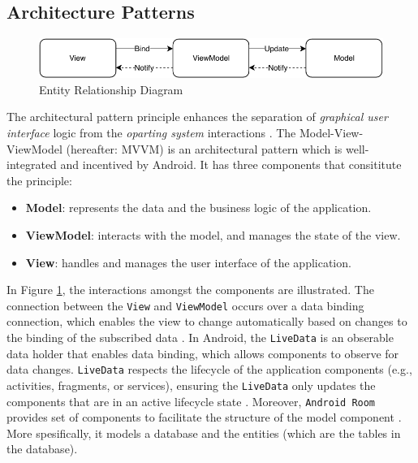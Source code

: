 \subsection{Architecture Patterns}

\begin{figure}
    \centering
    \includegraphics[scale=0.7]{images/MVVM.pdf}
    \caption{Entity Relationship Diagram}
    \label{fig:mvvm}
\end{figure}

The architectural pattern principle enhances the separation of \textit{graphical user interface} logic from the \textit{oparting system} interactions \cite{architecture}. The Model-View-ViewModel (hereafter: MVVM) is an architectural pattern which is well-integrated and incentived by Android. It has three components that consititute the principle:
\begin{itemize}
    \item \textbf{Model}: represents the data and the business logic of the application. 
    \item \textbf{ViewModel}: interacts with the model, and manages the state of the view.
    \item \textbf{View}: handles and manages the user interface of the application.
\end{itemize}

In Figure \ref{fig:mvvm}, the interactions amongst the components are illustrated. The connection between the \verb|View| and \verb|ViewModel| occurs over a data binding connection, which enables the view to change automatically based on changes to the binding of the subscribed data \cite{mvvm}. In Android, the \verb|LiveData| is an obserable data holder that enables data binding, which allows components to observe for data changes. \verb|LiveData| respects the lifecycle of the application components (e.g., activities, fragments, or services), ensuring the \verb|LiveData| only updates the components that are in an active lifecycle state \cite{livedata}. Moreover, \verb|Android Room| provides set of components to facilitate the structure of the model component \cite{room}. More spesifically, it models a database and the entities (which are the tables in the database).

